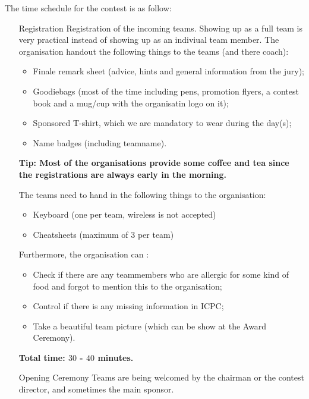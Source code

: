 The time schedule for the contest is as follow:
\begin{itemize}
\item[Registration] Registration of the incoming teams. Showing up as a full team is very practical instead of showing up as an indiviual team member. The organisation handout the following things to the teams (and there coach):
\begin{itemize}
\item Finale remark sheet (advice, hints and general information from the jury);
\item Goodiebags (most of the time including pens, promotion flyers, a contest book and a mug/cup with the organisatin logo on it);
\item Sponsored T-shirt, which we are mandatory to wear during the day(s);
\item Name badges (including teamname).
\end{itemize}
\textbf{Tip: Most of the organisations provide some coffee and tea since the registrations are always early in the morning.}

The teams need to hand in the following things to the organisation:
\begin{itemize}
\item Keyboard (one per team, wireless is not accepted)
\item Cheatsheets (maximum of $3$ per team)
\end{itemize}

Furthermore, the organisation can :
\begin{itemize}
\item Check if there are any teammembers who are allergic for some kind of food and forgot to mention this to the organisation;
\item Control if there is any missing information in ICPC;
\item Take a beautiful team picture (which can be show at the Award Ceremony).
\end{itemize}

\textbf{Total time: $30$ - $40$ minutes.}

\item[Opening Ceremony] Teams are being welcomed by the chairman or the contest director, and sometimes the main sponsor.


\end{itemize}
